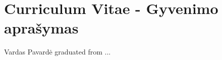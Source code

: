 \chapter*{Curriculum Vitae - Gyvenimo aprašymas}
\label{cha:cv}



Vardas Pavardė graduated from ... 